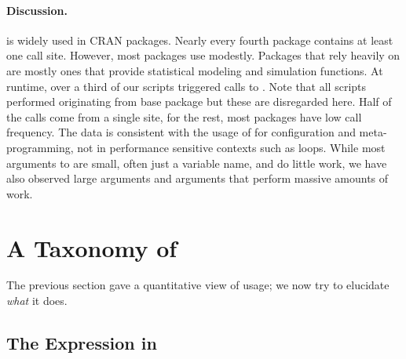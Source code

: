 \documentclass[review,screen,acmsmall]{acmart}%
\begin{document}
\paragraph{Discussion.}
\Eval is widely used in CRAN packages. Nearly every fourth package contains at
least one \eval call site. However, most packages use \eval modestly. Packages
that rely heavily on \eval are mostly ones that provide statistical modeling and
simulation functions. At runtime, over a third of our scripts triggered calls to
\eval. Note that all scripts performed \evals originating from base package but
these are disregarded here. Half of the calls come from a single site, for the
rest, most packages have low call frequency. The data is consistent with the usage
of \eval for configuration and meta-programming, not in performance sensitive
contexts such as loops. While most arguments to \eval are small, often just a
variable name, and do little work, we have also observed large \eval arguments
and arguments that perform massive amounts of work.

\section{A Taxonomy of \Eval}

The previous section gave a quantitative view of \eval usage; we now try to
elucidate \emph{what} it does.

\subsection{The Expression in \Eval} \label{sec:minimized}
\end{document}
